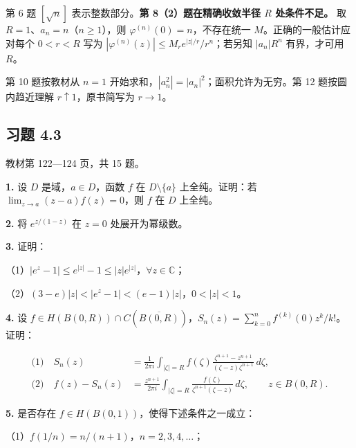 \documentclass[11pt,a4paper]{article}
\begin{document}
第 6 题 \([\sqrt n]\) 表示整数部分。\textbf{第 8（2）题在精确收敛半径
\(R\) 处条件不足。} 取 \(R=1\)、\(a_n=n\)（\(n\ge1\)），则
\(\varphi^{(n)}(0)=n\)，不存在统一 \(M\)。正确的一般估计应对每个
\(0<r<R\) 写为 \(|\varphi^{(n)}(z)|\le M_r e^{|z|/r}/r^n\)；若另知
\(|a_n|R^n\) 有界，才可用 \(R\)。

第 10 题按教材从 \(n=1\)
开始求和，\(|a_n^2|=|a_n|^2\)；面积允许为无穷。第 12 题按圆内趋近理解
\(r\uparrow1\)，原书简写为 \(r\to1\)。

\subsection{习题 4.3}\label{ch04-practice-heading-3}

教材第 122---124 页，共 15 题。

\par{}
\noindent\textbf{1.} 设 \(D\) 是域，\(a\in D\)，函数 \(f\) 在 \(D\setminus\{a\}\)
上全纯。证明：若 \(\lim_{z\to a}(z-a)f(z)=0\)，则 \(f\) 在 \(D\)
上全纯。

\par{}
\noindent\textbf{2.} 将 \(e^{z/(1-z)}\) 在 \(z=0\) 处展开为幂级数。

\par{}
\noindent\textbf{3.} 证明：

（1）\(|e^z-1|\le e^{|z|}-1\le |z|e^{|z|}\)，\(\forall z\in\mathbb C\)；

（2）\((3-e)|z|<|e^z-1|<(e-1)|z|\)，\(0<|z|<1\)。

\par{}
\noindent\textbf{4.} 设
\(f\in H(B(0,R))\cap C(\overline{B(0,R)})\)，\(S_n(z)=\sum_{k=0}^nf^{(k)}(0)z^k/k!\)。证明：

\[
\begin{aligned}
\text{(1)}\quad S_n(z)&=\frac1{2\pi i}\int_{|\zeta|=R}f(\zeta)
\frac{\zeta^{n+1}-z^{n+1}}{(\zeta-z)\zeta^{n+1}}\,d\zeta,\\
\text{(2)}\quad f(z)-S_n(z)&=\frac{z^{n+1}}{2\pi i}\int_{|\zeta|=R}
\frac{f(\zeta)}{\zeta^{n+1}(\zeta-z)}\,d\zeta,
\qquad z\in B(0,R).
\end{aligned}
\]

\par{}
\noindent\textbf{5.} 是否存在 \(f\in H(B(0,1))\)，使得下述条件之一成立：

（1）\(f(1/n)=n/(n+1)\)，\(n=2,3,4,\ldots\)；
\end{document}
